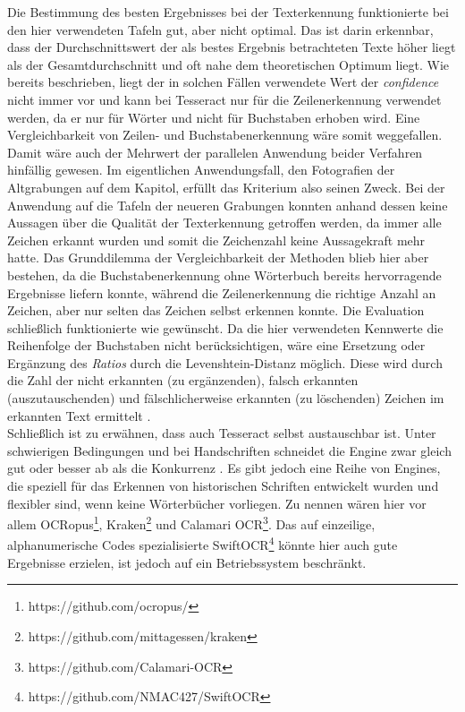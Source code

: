 Die Bestimmung des besten Ergebnisses bei der Texterkennung funktionierte bei den hier verwendeten Tafeln gut, aber nicht optimal. Das ist darin erkennbar, dass der Durchschnittswert der als bestes Ergebnis betrachteten Texte höher liegt als der Gesamtdurchschnitt und oft nahe dem theoretischen Optimum liegt. Wie bereits beschrieben, liegt der in solchen Fällen verwendete Wert der \textit{confidence} nicht immer vor und kann bei Tesseract nur für die Zeilenerkennung verwendet werden, da er nur für Wörter und nicht für Buchstaben erhoben wird. Eine Vergleichbarkeit von Zeilen- und Buchstabenerkennung wäre somit weggefallen. Damit wäre auch der Mehrwert der parallelen Anwendung beider Verfahren hinfällig gewesen. Im eigentlichen Anwendungsfall, den Fotografien der Altgrabungen auf dem Kapitol, erfüllt das Kriterium also seinen Zweck. Bei der Anwendung auf die Tafeln der neueren Grabungen konnten anhand dessen keine Aussagen über die Qualität der Texterkennung getroffen werden, da immer alle Zeichen erkannt wurden und somit die Zeichenzahl keine Aussagekraft mehr hatte. Das Grunddilemma der Vergleichbarkeit der Methoden blieb hier aber bestehen, da die Buchstabenerkennung ohne Wörterbuch bereits hervorragende Ergebnisse liefern konnte, während die Zeilenerkennung die richtige Anzahl an Zeichen, aber nur selten das Zeichen selbst erkennen konnte.
Die Evaluation schließlich funktionierte wie gewünscht. Da die hier verwendeten Kennwerte die Reihenfolge der Buchstaben nicht berücksichtigen, wäre eine Ersetzung oder Ergänzung des \textit{Ratios} durch die Levenshtein-Distanz möglich. Diese wird durch die Zahl der nicht erkannten (zu ergänzenden), falsch erkannten (auszutauschenden) und fälschlicherweise erkannten (zu löschenden) Zeichen im erkannten Text ermittelt  \cite{Levenshtein_SPD66}.\\
Schließlich ist zu erwähnen, dass auch Tesseract selbst austauschbar ist. Unter schwierigen Bedingungen und bei Handschriften schneidet die Engine zwar gleich gut oder besser ab als die Konkurrenz \cite{forsberg}. Es gibt jedoch eine Reihe von Engines, die speziell für das Erkennen von historischen Schriften entwickelt wurden und flexibler sind, wenn keine Wörterbücher vorliegen. Zu nennen wären hier vor allem OCRopus\footnote{https://github.com/ocropus/}, Kraken\footnote{https://github.com/mittagessen/kraken} und Calamari OCR\footnote{https://github.com/Calamari-OCR}. Das auf einzeilige, alphanumerische Codes spezialisierte SwiftOCR\footnote{https://github.com/NMAC427/SwiftOCR} könnte hier auch gute Ergebnisse erzielen, ist jedoch auf ein Betriebssystem beschränkt.
